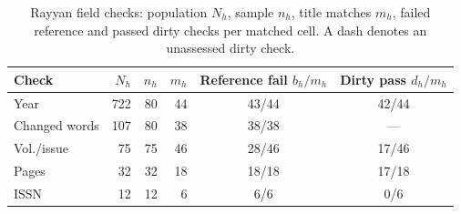 \begin{table}[tbp]
  \caption{Rayyan field checks: population $N_h$, sample $n_h$, title matches $m_h$,
  failed reference and passed dirty checks per matched cell. A dash denotes an unassessed dirty check.}
  \label{tab:rayyan}
  \small
  \setlength{\tabcolsep}{3pt}
  \begin{tabular*}{\columnwidth}{@{\extracolsep{\fill}}lrrrcc@{}}
    \toprule
    Check & $N_h$ & $n_h$ & $m_h$ & \shortstack{Reference fail\\$b_h/m_h$} & \shortstack{Dirty pass\\$d_h/m_h$} \\
    \midrule
    Year & 722 & 80 & 44 & 43/44 & 42/44 \\
    Changed words & 107 & 80 & 38 & 38/38 & --- \\
    Vol./issue & 75 & 75 & 46 & 28/46 & 17/46 \\
    Pages & 32 & 32 & 18 & 18/18 & 17/18 \\
    ISSN & 12 & 12 & 6 & 6/6 & 0/6 \\
    \bottomrule
  \end{tabular*}
\end{table}
